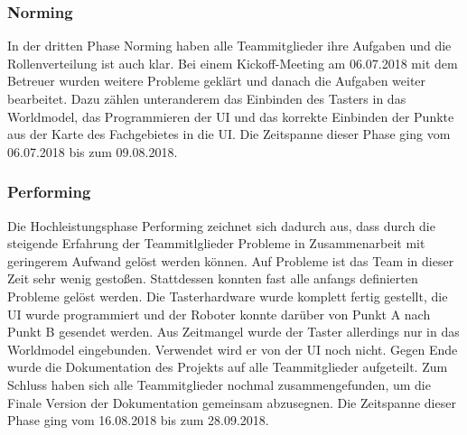 \documentclass[a4paper,12pt,headsepline]{scrartcl}
\begin{document}
	\subsubsection{Norming}
		In der dritten Phase Norming haben alle Teammitglieder ihre Aufgaben und die Rollenverteilung ist auch klar. Bei einem Kickoff-Meeting am 06.07.2018 mit dem Betreuer wurden weitere Probleme geklärt und danach die Aufgaben weiter bearbeitet. Dazu zählen unteranderem das Einbinden des Tasters in das Worldmodel, das Programmieren der UI und das korrekte Einbinden der Punkte aus der Karte des Fachgebietes in die UI. Die Zeitspanne dieser Phase ging vom 06.07.2018 bis zum 09.08.2018.
	\subsubsection{Performing}
		Die Hochleistungsphase Performing zeichnet sich dadurch aus, dass durch die steigende Erfahrung der Teammitlglieder Probleme in Zusammenarbeit mit geringerem Aufwand gelöst werden können. Auf Probleme ist das Team in dieser Zeit sehr wenig gestoßen. Stattdessen konnten fast alle anfangs definierten Probleme gelöst werden. Die Tasterhardware wurde komplett fertig gestellt, die UI wurde programmiert und der Roboter konnte darüber von Punkt A nach Punkt B gesendet werden. Aus Zeitmangel wurde der Taster allerdings nur in das Worldmodel eingebunden. Verwendet wird er von der UI noch nicht. Gegen Ende wurde die Dokumentation des Projekts auf alle Teammitglieder aufgeteilt. Zum Schluss haben sich alle Teammitglieder nochmal zusammengefunden, um die Finale Version der Dokumentation gemeinsam abzusegnen. Die Zeitspanne dieser Phase ging vom 16.08.2018 bis zum 28.09.2018.
\end{document}

